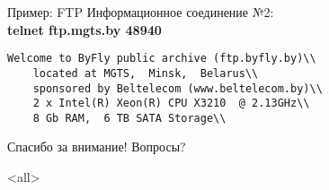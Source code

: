 \begin{frame}{Пример: FTP}
Информационное соединение №2:\\
\medskip
\scriptsize
{\bfseries telnet ftp.mgts.by 48940}\\
\begin{verbatim}
Welcome to ByFly public archive (ftp.byfly.by)\\
	located at MGTS,  Minsk,  Belarus\\
	sponsored by Beltelecom (www.beltelecom.by)\\
	2 x Intel(R) Xeon(R) CPU X3210  @ 2.13GHz\\
	8 Gb RAM,  6 TB SATA Storage\\
\end{verbatim}
\normalsize
\end{frame}

\begin{frame}{}
\Huge
\begin{center}
	Спасибо за внимание!
	\bigskip
	Вопросы?
\end{center}
\normalsize
\end{frame}

\mode<all>{}


